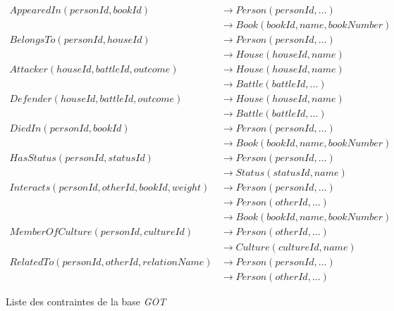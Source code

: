 \begin{figure}[H]
    \centering
    \begin{adjustbox}{max width=\linewidth,max height=.5\textheight}
        \parbox{\linewidth}{\begin{align*}
                AppearedIn(personId, bookId)                 & \to Person(personId, \dots)        \\
                                                             & \to Book(bookId, name, bookNumber) \\
                BelongsTo(personId, houseId)                 & \to Person(personId, \dots)        \\
                                                             & \to House(houseId, name)           \\
                Attacker(houseId, battleId, outcome)         & \to House(houseId, name)           \\
                                                             & \to Battle(battleId, \dots)        \\
                Defender(houseId, battleId, outcome)         & \to House(houseId, name)           \\
                                                             & \to Battle(battleId, \dots)        \\
                DiedIn(personId, bookId)                     & \to Person(personId, \dots)        \\
                                                             & \to Book(bookId, name, bookNumber) \\
                HasStatus(personId, statusId)                & \to Person(personId, \dots)        \\
                                                             & \to Status(statusId, name)         \\
                Interacts(personId, otherId, bookId, weight) & \to Person(personId, \dots)        \\
                                                             & \to Person(otherId, \dots)         \\
                                                             & \to Book(bookId, name, bookNumber) \\
                MemberOfCulture(personId, cultureId)         & \to Person(otherId, \dots)         \\
                                                             & \to Culture(cultureId, name)       \\
                RelatedTo(personId, otherId, relationName)   & \to Person(personId, \dots)        \\
                                                             & \to Person(otherId, \dots)
            \end{align*}}
    \end{adjustbox}
    \caption{Liste des contraintes de la base \emph{GOT}}
\end{figure}

